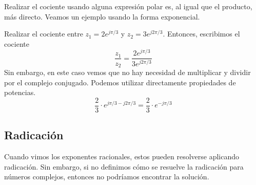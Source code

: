 Realizar el cociente usando alguna expresión polar es, al igual que el producto, más directo. Veamos un ejemplo usando la forma exponencial.
\begin{example}
  Realizar el cociente entre $z_1=2e^{j\pi/3}$ y $z_2=3e^{j2\pi/3}$. Entonces, escribimos el cociente
  $$
  \frac{z_1}{z_2}=\frac{2e^{j\pi/3}}{3e^{j2\pi/3}}
  $$
  Sin embargo, en este caso vemos que no hay necesidad de multiplicar y dividir por el complejo conjugado. Podemos utilizar directamente propiedades de potencias.
  $$
  \frac{2}{3}\cdot e^{j\pi/3 - j2\pi/3} = \frac{2}{3}\cdot e^{-j\pi/3}
  $$
\end{example}

\subsection{Radicación}

Cuando vimos los exponentes racionales, estos pueden resolverse aplicando radicación. Sin embargo, si no definimos cómo se resuelve la radicación para números complejos, entonces no podríamos encontrar la solución.


